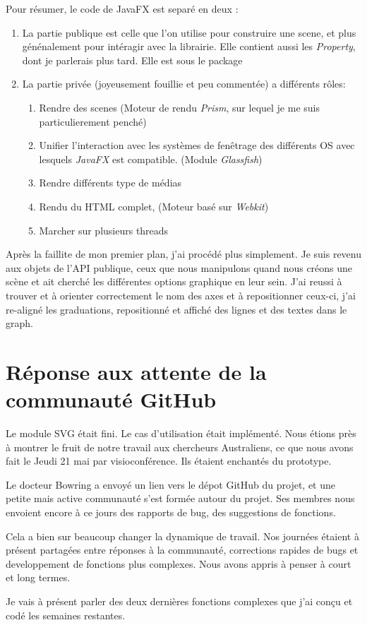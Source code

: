 Pour résumer, le code de JavaFX est separé en deux :
\begin{enumerate}
\item La partie publique est celle que l'on utilise pour construire une scene, et plus génénalement pour intéragir avec la librairie. Elle contient aussi les \textit{Property}, dont je parlerais plus tard. Elle est sous le package %
\item La partie privée (joyeusement fouillie et peu commentée) a différents rôles:%
  \begin{enumerate}	
  \item Rendre des scenes (Moteur de rendu \textit{Prism}, sur lequel je me suis particulierement penché)
  \item Unifier l'interaction avec les systèmes de fenêtrage des différents OS avec lesquels \textit{JavaFX} est compatible. (Module \textit{Glassfish})
  \item Rendre différents type de médias
  \item Rendu du HTML complet, (Moteur basé sur \textit{Webkit})
  \item Marcher sur plusieurs threads
  \end{enumerate}
\end{enumerate}

Après la faillite de mon premier plan, j'ai procédé plus simplement. Je suis revenu aux objets de l'API publique, ceux que nous manipulons quand nous créons une scène et ait cherché les différentes options graphique en leur sein. J'ai reussi à trouver et à orienter correctement le nom des axes et à repositionner ceux-ci, j'ai re-aligné les graduations, repositionné et affiché des lignes et des textes dans le graph.

%
%
%
\section{Réponse aux attente de la communauté GitHub}
Le module SVG était fini. Le cas d'utilisation était implémenté. Nous étions près à montrer le fruit de notre travail aux chercheurs Australiens, ce que nous avons fait le Jeudi%
21 mai par visioconférence. Ils étaient enchantés du prototype.

Le docteur Bowring a envoyé un lien vers le dépot GitHub du projet, et une petite mais active communauté s'est formée autour du projet. Ses membres nous envoient encore à ce jours des rapports de bug, des suggestions de fonctions.

Cela a bien sur beaucoup changer la dynamique de travail. Nos journées étaient à présent partagées entre réponses à la communauté, corrections rapides de bugs et developpement de fonctions plus complexes. Nous avons appris à penser à court et long termes.

Je vais à présent parler des deux dernières fonctions complexes que j'ai conçu et codé les semaines restantes.
